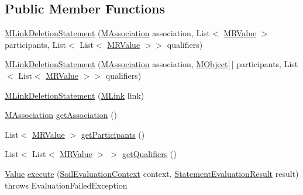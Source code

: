 \subsection*{Public Member Functions}
\begin{DoxyCompactItemize}
\item 
\hyperlink{classorg_1_1tzi_1_1use_1_1uml_1_1sys_1_1soil_1_1_m_link_deletion_statement_ab6014253f09a2b270baf26b88eaed953}{M\-Link\-Deletion\-Statement} (\hyperlink{interfaceorg_1_1tzi_1_1use_1_1uml_1_1mm_1_1_m_association}{M\-Association} association, List$<$ \hyperlink{classorg_1_1tzi_1_1use_1_1uml_1_1sys_1_1soil_1_1_m_r_value}{M\-R\-Value} $>$ participants, List$<$ List$<$ \hyperlink{classorg_1_1tzi_1_1use_1_1uml_1_1sys_1_1soil_1_1_m_r_value}{M\-R\-Value} $>$$>$ qualifiers)
\item 
\hyperlink{classorg_1_1tzi_1_1use_1_1uml_1_1sys_1_1soil_1_1_m_link_deletion_statement_a2acad185e47acf5e16cd7a6856e0c84c}{M\-Link\-Deletion\-Statement} (\hyperlink{interfaceorg_1_1tzi_1_1use_1_1uml_1_1mm_1_1_m_association}{M\-Association} association, \hyperlink{interfaceorg_1_1tzi_1_1use_1_1uml_1_1sys_1_1_m_object}{M\-Object}\mbox{[}$\,$\mbox{]} participants, List$<$ List$<$ \hyperlink{classorg_1_1tzi_1_1use_1_1uml_1_1sys_1_1soil_1_1_m_r_value}{M\-R\-Value} $>$$>$ qualifiers)
\item 
\hyperlink{classorg_1_1tzi_1_1use_1_1uml_1_1sys_1_1soil_1_1_m_link_deletion_statement_aa4012910b5591ad4215c715cffd2a792}{M\-Link\-Deletion\-Statement} (\hyperlink{interfaceorg_1_1tzi_1_1use_1_1uml_1_1sys_1_1_m_link}{M\-Link} link)
\item 
\hyperlink{interfaceorg_1_1tzi_1_1use_1_1uml_1_1mm_1_1_m_association}{M\-Association} \hyperlink{classorg_1_1tzi_1_1use_1_1uml_1_1sys_1_1soil_1_1_m_link_deletion_statement_a6ffcf89f5285b42cfdf2604d2d0ac509}{get\-Association} ()
\item 
List$<$ \hyperlink{classorg_1_1tzi_1_1use_1_1uml_1_1sys_1_1soil_1_1_m_r_value}{M\-R\-Value} $>$ \hyperlink{classorg_1_1tzi_1_1use_1_1uml_1_1sys_1_1soil_1_1_m_link_deletion_statement_a6df1241eaee07ef8194aa6c0cb936e34}{get\-Participants} ()
\item 
List$<$ List$<$ \hyperlink{classorg_1_1tzi_1_1use_1_1uml_1_1sys_1_1soil_1_1_m_r_value}{M\-R\-Value} $>$ $>$ \hyperlink{classorg_1_1tzi_1_1use_1_1uml_1_1sys_1_1soil_1_1_m_link_deletion_statement_af557f15b508aff9581975e9afc30c3af}{get\-Qualifiers} ()
\item 
\hyperlink{classorg_1_1tzi_1_1use_1_1uml_1_1ocl_1_1value_1_1_value}{Value} \hyperlink{classorg_1_1tzi_1_1use_1_1uml_1_1sys_1_1soil_1_1_m_link_deletion_statement_ad2a85e2821a5f2433d3dfa5f2e244899}{execute} (\hyperlink{classorg_1_1tzi_1_1use_1_1uml_1_1sys_1_1soil_1_1_soil_evaluation_context}{Soil\-Evaluation\-Context} context, \hyperlink{classorg_1_1tzi_1_1use_1_1uml_1_1sys_1_1_statement_evaluation_result}{Statement\-Evaluation\-Result} result)  throws Evaluation\-Failed\-Exception 

\end{DoxyCompactItemize}
